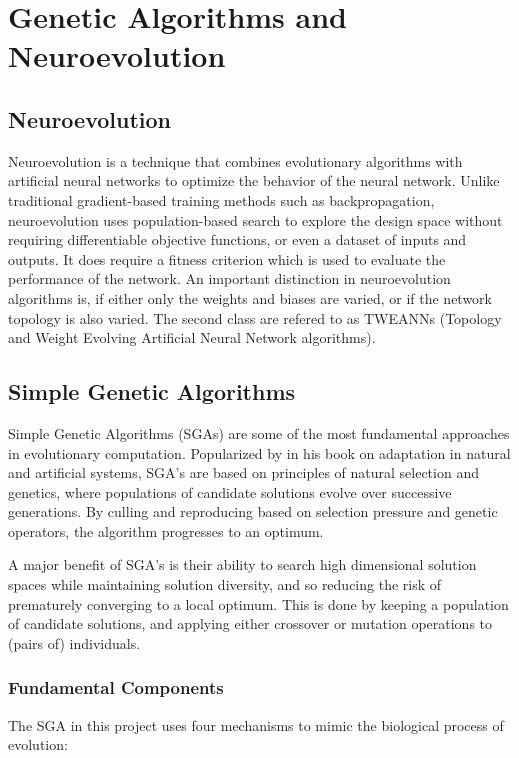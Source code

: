 \chapter{Genetic Algorithms and Neuroevolution}

\section{Neuroevolution}

Neuroevolution is a technique that combines evolutionary algorithms with
artificial neural networks to optimize the behavior of the neural network.
Unlike traditional gradient-based training methods such as backpropagation,
neuroevolution uses population-based search to explore the design space without
requiring differentiable objective functions, or even a dataset of inputs and
outputs. It does require a fitness criterion which is used to evaluate the
performance of the network. An important distinction in neuroevolution
algorithms is, if either only the weights and biases are varied, or if the network
topology is also varied. The second class are refered to as TWEANNs (Topology
and Weight Evolving Artificial Neural Network algorithms).

\section{Simple Genetic Algorithms}
Simple Genetic Algorithms (SGAs) are some of the most fundamental approaches in
evolutionary computation. Popularized by \textcite{holland1992adaptation} in
his book on adaptation in natural and artificial systems, SGA's are based on
principles of natural selection and genetics, where populations of candidate
solutions evolve over successive generations. By culling and reproducing based
on selection pressure and genetic operators, the algorithm progresses to an
optimum.

A major benefit of SGA's is their ability to search high dimensional solution
spaces while maintaining solution diversity, and so reducing the risk of
prematurely converging to a local optimum. This is done by keeping a population
of candidate solutions, and applying either crossover or mutation operations to
(pairs of) individuals.

\subsection{Fundamental Components}

The SGA in this project uses four mechanisms to mimic the biological process of
evolution:


